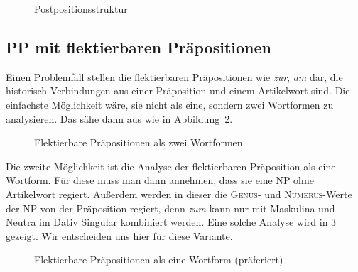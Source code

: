 \begin{exe}
\end{exe}

\begin{figure}[!htbp]
  \centering
  \caption{Postpositionsstruktur}
  \label{fig:postpos}
\end{figure}

\subsection{PP mit flektierbaren Präpositionen}

\label{sec:syntaxflektierbareprp}


Einen Problemfall stellen die flektierbaren Präpositionen wie \textit{zur}, \textit{am} dar, die historisch Verbindungen aus einer Präposition und einem Artikelwort sind.
Die einfachste Möglichkeit wäre, sie nicht als eine, sondern zwei Wortformen zu analysieren.
Das sähe dann aus wie in Abbildung~\ref{fig:flektprpreanalyse}.

\begin{figure}[!htbp]
  \centering
  \caption{Flektierbare Präpositionen als zwei Wortformen}
  \label{fig:flektprpreanalyse}
\end{figure}

Die zweite Möglichkeit ist die Analyse der flektierbaren Präposition als eine Wortform.
Für diese muss man dann annehmen, dass sie eine NP ohne Artikelwort regiert.
Außerdem werden in dieser die \textsc{Genus}- und \textsc{Numerus}-Werte der NP von der Präposition regiert, denn \textit{zum} kann \zB nur mit Maskulina und Neutra im Dativ Singular kombiniert werden.
Eine solche Analyse wird in \ref{fig:flektprpalswortform} gezeigt.
Wir entscheiden uns hier für diese Variante.

\begin{figure}[!htbp]
  \centering
  \caption{Flektierbare Präpositionen als eine Wortform (präferiert)}
  \label{fig:flektprpalswortform}
\end{figure}



